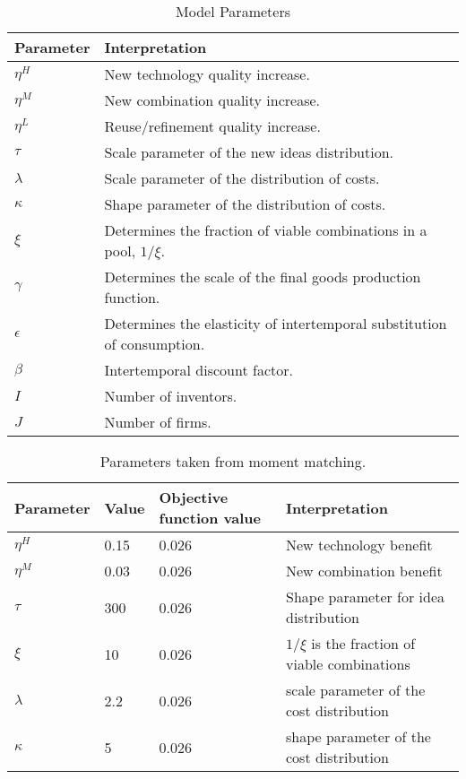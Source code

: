 \documentclass[a4paper,11pt]{article}
\begin{document}
\begin{table}[h!]
\caption{Model Parameters}
\centering
\begin{tabular}{ll}
\hline \hline
Parameter & Interpretation \\ \hline
$\eta^H$ & New technology quality increase. \\
$\eta^M$ & New combination quality increase. \\
$\eta^L$ & Reuse/refinement quality increase. \\
$\tau$ & Scale parameter of the new ideas distribution. \\
$\lambda$ & Scale parameter of the distribution of costs. \\
$\kappa$ & Shape parameter of the distribution of costs. \\
$\xi$ & Determines the fraction of viable combinations in a pool, $1/\xi$.\\
$\gamma$ & Determines the scale of the final goods production function. \\
$\epsilon$ & Determines the elasticity of intertemporal substitution of consumption.\\
$\beta$ & Intertemporal discount factor. \\
$I$ & Number of inventors.\\
$J$ & Number of firms.\\
\hline \hline
\end{tabular}
\end{table}

\begin{table}[h!]
\caption{Parameters taken from moment matching.}
\centering
\begin{tabular}{llll}
\hline \hline
Parameter & Value & Objective function value & Interpretation \\ \hline
$\eta^H$ & 0.15 & 0.026 & New technology benefit \\
$\eta^M$ & 0.03 & 0.026 & New combination benefit \\
$\tau$ & 300 & 0.026 & Shape parameter for idea distribution \\
$\xi$ & 10 & 0.026 & $1/\xi$ is the fraction of viable combinations \\
$\lambda $ & 2.2 & 0.026 & scale parameter of the cost distribution \\
$\kappa $ & 5 & 0.026 & shape parameter of the cost distribution \\
\hline \hline
\end{tabular}
\end{table}
\end{document}
